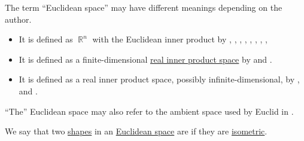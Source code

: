 \begin{remark}\label{rem:euclidean_space_etymology}
  The term \enquote{Euclidean space} may have different meanings depending on the author.
  \begin{itemize}
    \item It is defined as \( \BbbR^n \) with the Euclidean inner product by
    \textcite[\S 2.19]{Rudin1987RealAndComplexAnalysis},
    \textcite[example A-7.1]{Rotman2015AdvancedModernAlgebraPart1},
    \textcite[xv]{HugWeil2020ConvexGeometry},
    \textcite[1]{WheedenZygmund2015MeasureAndIntegral},
    \textcite[example 1.1.6]{Tao2022AnalysisII},
    \textcite[13]{HillePhillips1996FunctionalAnalysis},
    \textcite[11]{Tao2011MeasureTheory},
    \textcite[444]{ИльинСадовничийСендов1985АнализТом1},
    \textcite[105]{Обрешков1962ВисшаАлгебра}

    \item It is defined as a finite-dimensional \hyperref[def:inner_product_space]{real inner product space} by
    \textcite[\S 8.1.1]{Berger1987GeometryI} and
    \textcite[121]{Halmos1974VectorSpaces}.

    \item It is defined as a real inner product space, possibly infinite-dimensional, by
    \textcite[\S 24.1]{Тыртышников2007ЛинейнаяАлгебра},
    \textcite[def. 5.5.1]{Винберг2014КурсАлгебры} and
    \textcite[216]{Станилов1974АналитичнаГеометрия}.
  \end{itemize}

  \enquote{The} Euclidean space may also refer to the ambient space used by Euclid in \cite{Euclid2008Elements}.
\end{remark}

\begin{definition}\label{def:congruent_shapes}
  We say that two \hyperref[con:geometric_shape]{shapes} in an \hyperref[def:euclidean_space]{Euclidean space} are  if they are \hyperref[def:isometry]{isometric}.
\end{definition}

